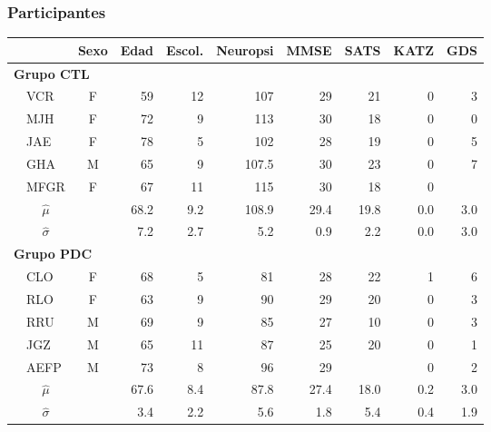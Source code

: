 \documentclass[serif,mathserif,professionalfont]{beamer}
\newcommand{\bordes}[1]{\renewcommand{\arraystretch}{#1}}
\newcommand{\pz}{\phantom{.0}}
\begin{document}
\begin{frame}\frametitle{Participantes}
\begin{table}
\centering
\bordes{1.1}
\begin{tiny}
\begin{tabular}{llcrrrrrrr}
\toprule
 \phantom{.}&
 & {Sexo} & {Edad} & {Escol.} & {Neuropsi} & {MMSE} & {SATS} & {KATZ} & {GDS} \\
\midrule
\multicolumn{6}{l}{\textbf{Grupo CTL}}\\
&VCR    & F    & 59\pz & 12\pz & 107\pz & 29\pz & 21\pz & 0\pz & 3\pz \\
&MJH    & F    & 72\pz & 9\pz  & 113\pz & 30\pz & 18\pz & 0\pz & 0\pz \\
&JAE    & F    & 78\pz & 5\pz  & 102\pz & 28\pz & 19\pz & 0\pz & 5\pz \\
&GHA    & M    & 65\pz & 9\pz  & 107.5  & 30\pz & 23\pz & 0\pz & 7\pz \\
&MFGR   & F    & 67\pz & 11\pz & 115\pz & 30\pz & 18\pz & 0\pz &      \\
\rowcolor{gris}
&\multicolumn{1}{c}{$\widehat{\mu}$} & 
               & 68.2  & 9.2   & 108.9  & 29.4  & 19.8  & 0.0  & 3.0  \\
\rowcolor{gris}
&\multicolumn{1}{c}{$\widehat{\sigma}$} & 
               & 7.2   & 2.7   & 5.2    & 0.9   & 2.2   & 0.0  & 3.0  \\
\midrule
\multicolumn{6}{l}{\textbf{Grupo PDC}}\\
&CLO    & F    & 68\pz & 5\pz  & 81\pz & 28\pz & 22\pz & 1\pz & 6\pz \\
&RLO    & F    & 63\pz & 9\pz  & 90\pz & 29\pz & 20\pz & 0\pz & 3\pz \\
&RRU    & M    & 69\pz & 9\pz  & 85\pz & 27\pz & 10\pz & 0\pz & 3\pz \\
&JGZ    & M    & 65\pz & 11\pz & 87\pz & 25\pz & 20\pz & 0\pz & 1\pz \\
&AEFP   & M    & 73\pz &  8\pz & 96\pz & 29\pz &   \pz & 0\pz & 2\pz \\
\rowcolor{gris}
&\multicolumn{1}{c}{$\widehat{\mu}$} & 
              & 67.6   & 8.4   & 87.8  & 27.4  & 18.0  & 0.2  & 3.0  \\
\rowcolor{gris}
&\multicolumn{1}{c}{$\widehat{\sigma}$} & 
              & 3.4    & 2.2   & 5.6   & 1.8   & 5.4   & 0.4  & 1.9  \\
\bottomrule
\end{tabular} 
\end{tiny}
\end{table}
\end{frame}
\end{document}
